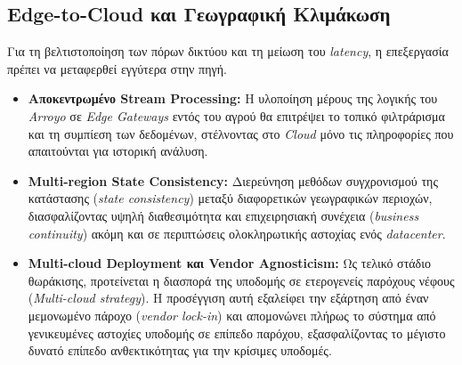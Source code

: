 \subsection{Edge-to-Cloud και Γεωγραφική Κλιμάκωση}

Για τη βελτιστοποίηση των πόρων δικτύου και τη μείωση του \textit{latency}, η
επεξεργασία πρέπει να μεταφερθεί εγγύτερα στην πηγή.

\begin{itemize}
	\item \textbf{Αποκεντρωμένο Stream Processing:} Η υλοποίηση μέρους της
	      λογικής του \textit{Arroyo} σε \textit{Edge Gateways} εντός του
	      αγρού θα επιτρέψει το τοπικό φιλτράρισμα και τη συμπίεση των
	      δεδομένων, στέλνοντας στο \textit{Cloud} μόνο τις πληροφορίες
	      που απαιτούνται για ιστορική ανάλυση.
	\item \textbf{Multi-region State Consistency:} Διερεύνηση μεθόδων
	      συγχρονισμού της κατάστασης (\textit{state consistency}) μεταξύ
	      διαφορετικών γεωγραφικών περιοχών, διασφαλίζοντας υψηλή
	      διαθεσιμότητα και επιχειρησιακή συνέχεια (\textit{business
		      continuity}) ακόμη και σε περιπτώσεις ολοκληρωτικής αστοχίας
	      ενός \textit{datacenter}.
	\item \textbf{Multi-cloud Deployment και Vendor Agnosticism:} Ως τελικό
	      στάδιο θωράκισης, προτείνεται η διασπορά της υποδομής σε
	      ετερογενείς παρόχους νέφους (\textit{Multi-cloud strategy}). Η
	      προσέγγιση αυτή εξαλείφει την εξάρτηση από έναν μεμονωμένο
	      πάροχο (\textit{vendor lock-in}) και απομονώνει πλήρως το
	      σύστημα από γενικευμένες αστοχίες υποδομής σε επίπεδο παρόχου,
	      εξασφαλίζοντας το μέγιστο δυνατό επίπεδο ανθεκτικότητας για την
	      κρίσιμες υποδομές.
\end{itemize}
